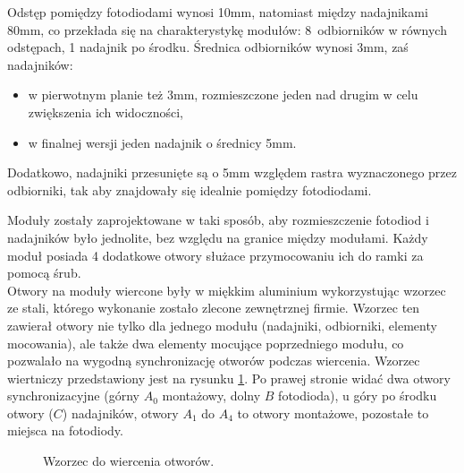 Odstęp pomiędzy fotodiodami wynosi 10mm, natomiast między nadajnikami 80mm, co przekłada się na charakterystykę modułów: 8~odbiorników w równych odstępach, 1 nadajnik po środku.
Średnica odbiorników wynosi 3mm, zaś nadajników:
\begin{itemize}
 \item w pierwotnym planie też 3mm, rozmieszczone jeden nad drugim w celu zwiększenia ich widoczności,
 \item w finalnej wersji jeden nadajnik o średnicy 5mm.\\
\end{itemize}

Dodatkowo, nadajniki przesunięte są o 5mm względem rastra wyznaczonego przez odbiorniki, tak aby znajdowały się idealnie pomiędzy fotodiodami.

Moduły zostały zaprojektowane w taki sposób, aby rozmieszczenie fotodiod i nadajników było jednolite, bez względu na granice między modułami. Każdy moduł posiada 4 dodatkowe otwory służace przymocowaniu ich do ramki za pomocą śrub.\\

Otwory na moduły wiercone były w miękkim aluminium wykorzystując wzorzec ze stali, którego wykonanie zostało zlecone zewnętrznej firmie.
Wzorzec ten zawierał otwory nie tylko dla jednego modułu (nadajniki, odbiorniki, elementy mocowania), ale także dwa elementy mocujące poprzedniego modułu, co pozwalało na wygodną synchronizację otworów podczas wiercenia. Wzorzec wiertniczy przedstawiony jest na rysunku \ref{fig:holes_master}. Po prawej stronie widać dwa otwory synchronizacyjne (górny $A_0$ \ppauza montażowy, dolny $B$ \ppauza fotodioda), u góry po środku otwory ($C$) nadajników, otwory $A_1$ do $A_4$ to otwory montażowe, pozostałe to miejsca na fotodiody.\\

\begin{figure}
 \centering
 \makebox[\textwidth][r]{
    \def\svgwidth{\textwidth}
    
  }
 \caption{Wzorzec do wiercenia otworów.}
 \label{fig:holes_master}
\end{figure}

